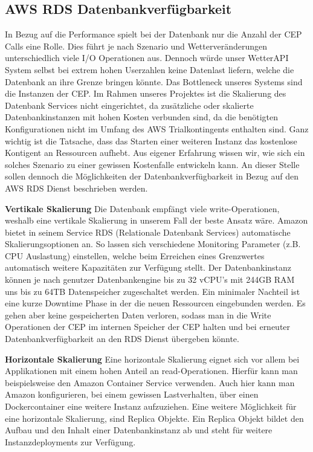 \subsection{AWS RDS Datenbankverfügbarkeit}
In Bezug auf die Performance spielt bei der Datenbank nur die Anzahl der CEP Calls eine Rolle. Dies führt je nach Szenario und Wetterveränderungen unterschiedlich viele I/O Operationen aus. Dennoch würde unser WetterAPI System selbst bei extrem hohen Userzahlen keine Datenlast liefern, welche die Datenbank an ihre Grenze bringen könnte. Das Bottleneck unseres Systems sind die Instanzen der CEP. Im Rahmen unseres Projektes ist die Skalierung des Datenbank Services nicht eingerichtet, da zusätzliche oder skalierte Datenbankinstanzen mit hohen Kosten verbunden sind, da die benötigten Konfigurationen nicht im Umfang des AWS Trialkontingents enthalten sind. Ganz wichtig ist die Tatsache, dass das Starten einer weiteren Instanz das kostenlose Kontigent an Ressourcen aufhebt. Aus eigener Erfahrung wissen wir, wie sich ein solches Szenario zu einer gewissen Kostenfalle entwickeln kann.
An dieser Stelle sollen dennoch die Möglichkeiten der Datenbankverfügbarkeit in Bezug auf den AWS RDS Dienst beschrieben werden.

\textbf{Vertikale Skalierung}
Die Datenbank empfängt viele write-Operationen, weshalb eine vertikale Skalierung in unserem Fall der beste Ansatz wäre. Amazon bietet in seinem Service RDS (Relationale Datenbank Services) automatische Skalierungsoptionen an. So lassen sich verschiedene Monitoring Parameter (z.B. CPU Auslastung) einstellen, welche beim Erreichen eines Grenzwertes automatisch weitere Kapazitäten zur Verfügung stellt. Der Datenbankinstanz können je nach genutzer Datenbankengine bis zu 32 vCPU's mit 244GB RAM uns bis zu 64TB Datenspeicher zugeschaltet werden. Ein minimaler Nachteil ist eine kurze Downtime Phase in der die neuen Ressourcen eingebunden werden. Es gehen aber keine gespeicherten Daten verloren, sodass man in die Write Operationen der CEP im internen Speicher der CEP halten und bei erneuter Datenbankverfügbarkeit an den RDS Dienst übergeben könnte.

\textbf{Horizontale Skalierung}
Eine horizontale Skalierung eignet sich vor allem bei Applikationen mit einem hohen Anteil an read-Operationen. Hierfür kann man beispielsweise den Amazon Container Service verwenden. Auch hier kann man Amazon konfigurieren, bei einem gewissen Lastverhalten, über einen Dockercontainer eine weitere Instanz aufzuziehen.
Eine weitere Möglichkeit für eine horizontale Skalierung, sind Replica Objekte. Ein Replica Objekt bildet den Aufbau und den Inhalt einer Datenbankinstanz ab und steht für weitere Instanzdeployments zur Verfügung. 


